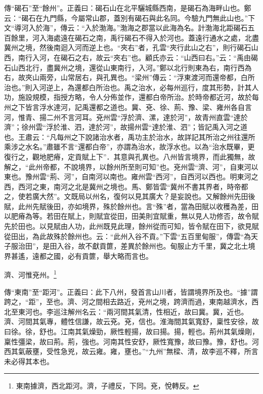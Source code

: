 {\noindent\zhuan{}\fzbyks 傳“碣石”至“餘州”。正義曰：碣石山在北平驪城縣西南，是碣石為海畔山也。鄭云：“碣石在九門縣，今屬常山郡，蓋別有碣石與此名同。今驗九門無此山也。”下文“導河入於海”，傳云：“入於渤海。”渤海之郡當以此海為名。計渤海北距碣石五百餘里，河入海處遠在碣石之南，禹行碣石不得入於河也。蓋遠行通水之處，北盡冀州之境，然後南迴入河而逆上也。“夾右”者，孔雲“夾行此山之右”，則行碣石山西，南行入河，在碣石之右，故云“夾右”也。顧氏亦云：“山西曰右。”云：“禹由碣石山西北行，盡冀州之境，還從山東南行，入河。”鄭以北行則東為右，南行西為右，故夾山兩旁，山常居右，與孔異也。“梁州”傳云：“浮東渡河而還帝都，白所治也。”則入河逆上，為還都白所治也。禹之治水，必每州巡行，度其形勢，計其人功，施設規模，指授方略，令人分佈並作，還都白帝所治。於時帝都近河，故於每州之下皆言浮水達河，記禹還都之道也。冀、兗、徐、荊、豫、梁、雍州各自言河，惟青、揚二州不言河耳。兗州雲“浮於濟、漯，達於河”，故青州直雲“達於濟”；徐州雲“浮於淮、泗，達於河”，故揚州雲“達於淮、泗”；皆記禹入河之道也。王肅云：“凡每州之下說諸治水者，禹功主於治水，故詳記其所治之州往還所乘涉之水名。”肅雖不言“還都白帝”，亦謂為治水，故浮水也。以為“治水既畢，更復行之，觀地肥瘠，定貢賦上下”．其意與孔異也。八州皆言境界，而此獨無，故解之，“此州帝都，不說境界，以餘州所至則可知”也。兗州雲“濟、河”，自東河以東也。豫州雲“荊、河”，自南河以南也。雍州雲“西河”，自西河以西也。明東河之西，西河之東，南河之北是冀州之境也。馬、鄭皆雲“冀州不書其界者，時帝都之，使若廣大然”。文既局以州名，復何以見其廣大？是妄說也。又解餘州先田後賦，此州先賦後田，亦如境界，殊於餘州也。言“殊”者，當為田賦以收穫為差，田以肥瘠為等。若田在賦上，則賦宜從田，田美則宜賦重，無以見人功修否，故令賦先於田也。以見賦由人功，此州既見此理，餘州從而可知，皆令賦在田下，欲見賦從田出，為此故殊於餘州也。云：“此州入谷不貢。”下雲“五百里甸服”，傳雲“為天子服治田”，是田入谷，故不獻貢篚，差異於餘州也。甸服止方千里，冀之北土境界甚遙，遠都之國，必有貢篚，舉大略而言也。 \par}

濟、河惟兗州。\footnote{東南據濟，西北距河。濟，子禮反，下同。兗，悅轉反。}

{\noindent\zhuan{}\fzbyks 傳“東南”至“距河”。正義曰：此下八州，發首言山川者，皆謂境界所及也。“據”謂跨之，“距”，至也。濟、河之間相去路近，兗州之境，跨濟而過，東南越濟水，西北至東河也。李巡注解州名云：“兩河間其氣清，性相近，故曰冀。冀，近也。濟、河間其氣專，體性信謙，故云兗。兗，信也。淮海間其氣寬舒，稟性安徐，故曰徐。徐，舒也。江南其氣燥勁，厥性輕揚，故曰揚。揚，輕也。荊州其氣燥剛，稟性彊梁，故曰荊。荊，強也。河南其性安舒，厥性寬豫，故曰豫。豫，舒也。河西其氣蔽壅，受性急兇，故云雍。雍，壅也。”“九州”無樑、清，故李巡不釋，所言未必得其本也。 \par}

